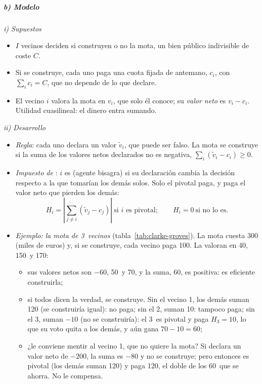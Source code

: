 \documentclass[11pt]{article}
\begin{document}
\subparagraph{b) Modelo}

\hspace*{3.6em}\emph{i) Supuestos}

\begin{itemize}
\item $I$ vecinos deciden si construyen o no la mota, un bien público indivisible de coste $C$.
\item Si se construye, cada uno paga una cuota fijada de antemano, $c_i$, con $\sum_ic_i=C$, que no depende de lo que declare.
\item El vecino $i$ valora la mota en $v_i$, que solo él conoce; su \emph{valor neto} es $v_i-c_i$. Utilidad cuasilineal: el dinero entra sumando.
\end{itemize}

\hspace*{3.6em}\emph{ii) Desarrollo}

\begin{itemize}
\item \emph{Regla}: cada uno declara un valor $\tilde{v}_i$, que puede ser falso. La mota se construye si la suma de los valores netos declarados no es negativa, $\sum_i(\tilde{v}_i-c_i)\geq0$.
\item \emph{Impuesto de }: $i$ es  (agente bisagra) si su declaración cambia la decisión respecto a la que tomarían los demás solos. Solo el pivotal paga, y paga el valor neto que pierden los demás:
  \begin{equation}\label{eq:clarke}
  H_i=\left|\sum_{j\neq i}(\tilde{v}_j-c_j)\right|\ \text{si }i\text{ es pivotal};\qquad H_i=0\ \text{si no lo es}.
  \end{equation}
\item \emph{Ejemplo: la mota de 3~vecinos} (tabla~\ref{tab:clarke-groves}). La mota cuesta 300 (miles de euros) y, si se construye, cada vecino paga 100. La valoran en 40, 150~y 170:
  \begin{itemize}
  \item sus valores netos son $-60$, 50~y 70, y la suma, 60, es positiva: es eficiente construirla;
  \item si todos dicen la verdad, se construye. Sin el vecino 1, los demás suman 120 (se construiría igual): no paga; sin el 2, suman 10: tampoco paga; sin el 3, suman $-10$ (no se construiría): el 3~es pivotal y paga $H_3=10$, lo que su voto quita a los demás, y aún gana $70-10=60$;
  \item ¿le conviene mentir al vecino 1, que no quiere la mota? Si declara un valor neto de $-200$, la suma es $-80$ y no se construye; pero entonces es pivotal (los demás suman 120) y paga 120, el doble de los 60~que se ahorra. No le compensa.
  \end{itemize}
\end{itemize}
\end{document}
